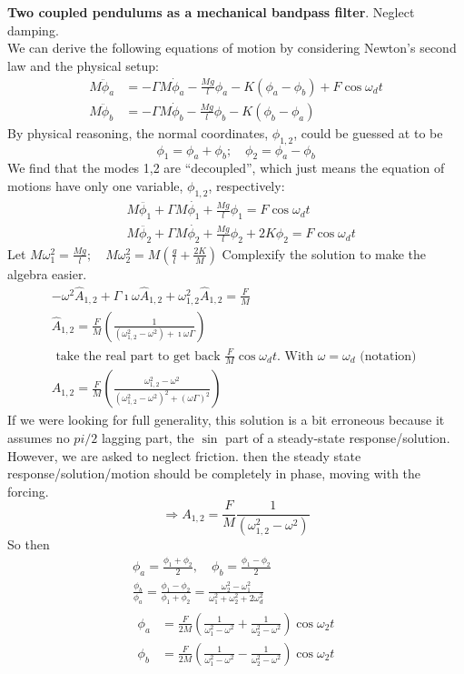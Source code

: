 \documentclass[twoside,10pt]{amsart}
\newcommand{\problemhead}[1]
  {\smallskip
   \noindent{\large\bf Problem #1.}
   \smallskip}
\begin{document}
\problemhead{3.28} \textbf{ Two coupled pendulums as a mechanical bandpass filter}.  Neglect damping.  \\
We can derive the following equations of motion by considering Newton's second law and the physical setup:
\[
\begin{aligned}
  M \ddot{\phi}_a & = - \Gamma M \dot{\phi}_a - \frac{ Mg}{l} \phi_a - K( \phi_a - \phi_b) + F \cos{ \omega_d t } \\
  M \ddot{\phi}_b & = - \Gamma M \dot{\phi}_b - \frac{ Mg}{l} \phi_b - K( \phi_b - \phi_a) 
\end{aligned}
\]
By physical reasoning, the normal coordinates, $\phi_{1,2}$, could be guessed at to be
\[
\phi_1 = \phi_a + \phi_b; \quad \phi_2 = \phi_a - \phi_b
\]
We find that the modes 1,2 are ``decoupled'', which just means the equation of motions have only one variable, $\phi_{1,2}$, respectively:
\[
\begin{aligned}
  & M \ddot{\phi_1} + \Gamma M \dot{\phi_1} + \frac{ Mg}{l} \phi_1 = F \cos{ \omega_d t} \\ 
  & M \ddot{\phi_2} + \Gamma M \dot{\phi_2} + \frac{ Mg}{l} \phi_2 + 2 K \phi_2 = F \cos{ \omega_d t}
\end{aligned}
\]
Let $M\omega_1^2 = \frac{ Mg}{l}; \quad M\omega_2^2 = M \left( \frac{g}{l} + \frac{2K}{M} \right)$
Complexify the solution to make the algebra easier. 
\[
\begin{gathered}
  -\omega^2 \hat{A}_{1,2} + \Gamma \imath \omega \hat{A}_{1,2} + \omega_{1,2}^2 \hat{A}_{1,2} = \frac{F}{M} \\
  \hat{A}_{1,2} = \frac{F}{M} \left( \frac{1}{ (\omega_{1,2}^2 - \omega^2) + \imath \omega \Gamma } \right)  \\
 \text{ take the real part to get back $\frac{F}{M} \cos{ \omega_d t} $.  With $\omega = \omega_d$ (notation) } \\
 A_{1,2} = \frac{F}{M} \left( \frac{ \omega_{1,2}^2 - \omega^2 }{ (\omega_{1,2}^2 - \omega^2)^2 + (\omega \Gamma)^2 } \right)
\end{gathered}
\]
If we were looking for full generality, this solution is a bit erroneous because it assumes no $pi/2$ lagging part, the $\sin$ part of a steady-state response/solution.  However, we are asked to neglect friction.  then the steady state response/solution/motion should be completely in phase, moving with the forcing.  
\[
\Longrightarrow A_{1,2} = \frac{F}{M} \frac{ 1 }{ (\omega_{1,2}^2 - \omega^2 ) }
\]
So then
\[
\begin{gathered}
  \phi_a = \frac{ \phi_1 + \phi_2}{2}, \quad   \phi_b = \frac{ \phi_1 - \phi_2}{2}   \\
\frac{ \phi_b}{\phi_a} = \frac{ \phi_1 - \phi_2 }{ \phi_1 + \phi_2 } = \frac{ \omega_2^2 - \omega_1^2 }{ \omega_1^2 + \omega_2^2 + 2 \omega_d^2 } \\
\begin{aligned}
  \phi_a & = \frac{F}{2M} \left( \frac{1}{ \omega_1^2 - \omega^2 } + \frac{1}{ \omega_2^2 - \omega^2 } \right) \cos{ \omega_2 t } \\
  \phi_b & = \frac{F}{2M} \left( \frac{1}{ \omega_1^2 - \omega^2 } - \frac{1}{ \omega_2^2 - \omega^2 } \right) \cos{ \omega_2 t }
\end{aligned}
\end{gathered}
\]
\end{document}
